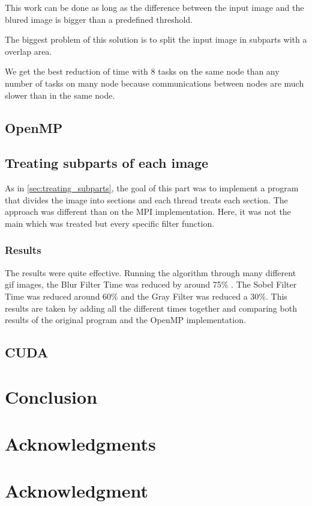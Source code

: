 \documentclass[conference,compsoc]{IEEEtran}
\begin{document}
This work can be done as long as the difference between the input image and the blured image is bigger than a predefined threshold.

The biggest problem of this solution is to split the input image in subparts with a overlap area.

We get the best reduction of time with 8 tasks on the same node than any number of tasks on many node because communications between nodes are much slower than in the same node.

\subsection{OpenMP}
\subsection{Treating subparts of each image}
As in \ref{sec:treating_subparts}, the goal of this part was to implement a program that divides the image into sections and each thread treats each section. The approach was different than on the MPI implementation. Here, it was not the main which was treated but every specific filter function.

\subsubsection{Results}
The results were quite effective. Running the algorithm through many different gif images, the Blur Filter Time was reduced by around 75\% . The Sobel Filter Time was reduced around 60\% and the Gray Filter was reduced a 30\%. This results are taken by adding all the different times together and comparing both results of the original program and the OpenMP implementation.

\subsection{CUDA}

\section{Conclusion}

\ifCLASSOPTIONcompsoc
  \section*{Acknowledgments}
\else
  \section*{Acknowledgment}
\fi

\newpage
{}


\end{document}
